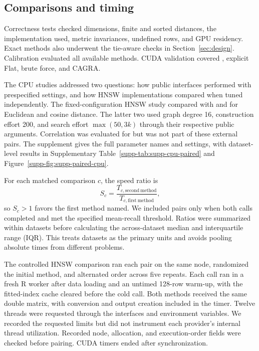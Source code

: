 \documentclass[article]{jss}
\newcommand{\method}[1]{\code{#1}}
\begin{document}
\subsection{Comparisons and timing}

Correctness tests checked dimensions, finite and sorted distances, the
implementation used, metric invariances, undefined rows, and GPU residency.
Exact methods also underwent the tie-aware checks in Section~\ref{sec:design}.
Calibration evaluated all available methods. CUDA validation covered
\method{auto}, explicit Flat, brute force, and CAGRA.

The CPU studies addressed two questions: how public interfaces performed with
prespecified settings, and how HNSW implementations compared when tuned
independently. The fixed-configuration HNSW study compared  with
 and  for Euclidean and cosine distance.
The latter two used graph degree 16, construction effort 200, and search
effort $\max(50,3k)$ through their respective public arguments. Correlation
was evaluated for  but was not part of these external pairs.
The supplement gives the full parameter names and settings, with dataset-level
results in Supplementary Table~\ref{supp-tab:supp-cpu-paired} and
Figure~\ref{supp-fig:supp-paired-cpu}.

For each matched comparison $c$, the speed ratio is
\begin{equation}
S_c=\frac{T_{c,\mathrm{second\ method}}}{T_{c,\mathrm{first\ method}}},
\label{eq:speed-ratio}
\end{equation}
so $S_c>1$ favors the first method named. We included pairs only when both
calls completed and met the specified mean-recall threshold. Ratios were
summarized within datasets before calculating the across-dataset median and
interquartile range (IQR). This treats datasets as the primary units and
avoids pooling absolute times from different problems.

The controlled HNSW comparison ran each pair on the same node, randomized
the initial method, and alternated order across five repeats. Each call ran
in a fresh R worker after data loading and an untimed 128-row warm-up, with
the fitted-index cache cleared before the cold call. Both methods received
the same double matrix, with conversion and output creation included in the
timer. Twelve threads were requested through the interfaces and environment
variables. We recorded the requested limits but did not instrument each
provider's internal thread utilization. Recorded node, allocation, and
execution-order fields were checked before pairing. CUDA timers ended after
synchronization.
\end{document}
